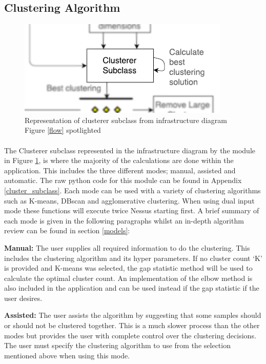 \subsection{Clustering Algorithm}
\label{infra4}

\begin{figure}[!h]
\centering
\includegraphics{./Figures/clustersubclass.png}
\caption{Representation of clusterer subclass from infrastructure diagram Figure \ref{flow} spotlighted}
\label{clustersub}
\end{figure}

\paragraph{}The Clusterer subclass represented in the infrastructure diagram by the module in Figure \ref{clustersub}, is where the majority of the calculations are done within the application. This includes the three different modes; manual, assisted and automatic. The raw python code for this module can be found in Appendix \ref{cluster_subclass}. Each mode can be used with a variety of clustering algorithms such as K-means, DBscan and agglomerative clustering. When using dual input mode these functions will execute twice Nessus starting first. A brief summary of each mode is given in the following paragraphs whilst an in-depth algorithm review can be found in section \ref{models}:

    \textbf{Manual:}
     The user supplies all required information to do the clustering. This includes the clustering algorithm and its hyper parameters. If no cluster count ‘K’ is provided and K-means was selected, the gap statistic method will be used to calculate the optimal cluster count. An implementation of the elbow method is also included in the application and can be used instead if the gap statistic if the user desires.

    \textbf{Assisted:}
     The user assists the algorithm by suggesting that some samples should or should not be clustered together. This is a much slower process than the other modes but provides the user with complete control over the clustering decisions. The user must specify the clustering algorithm to use from the selection mentioned above when using this mode.

